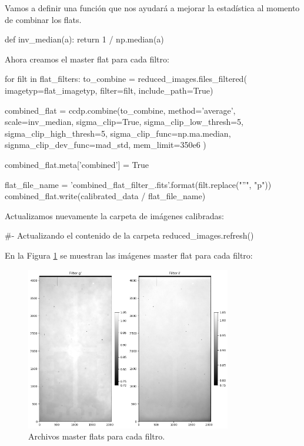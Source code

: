 Vamos a definir una función que nos ayudará a mejorar la estadística al momento de combinar los flats.

\begin{pyin}
def inv_median(a):
    return 1 / np.median(a)
\end{pyin}

Ahora creamos el master flat para cada filtro:

\begin{pyin}
for filt in flat_filters:
    to_combine = reduced_images.files_filtered(
                                imagetyp=flat_imagetyp, 
                                filter=filt, include_path=True)
                                
    combined_flat = ccdp.combine(to_combine,
                                 method='average', 
                                 scale=inv_median,
                                 sigma_clip=True, 
                                 sigma_clip_low_thresh=5, 
                                 sigma_clip_high_thresh=5,
                                 sigma_clip_func=np.ma.median,
                                 signma_clip_dev_func=mad_std,
                                 mem_limit=350e6
                                )

    combined_flat.meta['combined'] = True
    
    flat_file_name = 'combined_flat_filter_{}.fits'.format(filt.replace("''", "p"))
    combined_flat.write(calibrated_data / flat_file_name)
\end{pyin}
 
 Actualizamos nuevamente la carpeta de imágenes calibradas:
 
 \begin{pyin}[]
#- Actualizando el contenido de la carpeta
reduced_images.refresh()
 \end{pyin}
 
 En la Figura \ref{fig:master_flats} se muestran las imágenes master flat para cada filtro:
 
 \begin{figure}[htb]
   \centering
	 \includegraphics[width=0.8\textwidth]{figures/master_flats.png}
	 \caption{Archivos master flats para cada filtro.}
	 \label{fig:master_flats} 
 \end{figure}
 

